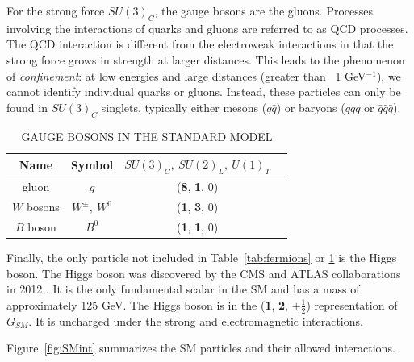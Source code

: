 For the strong force $SU(3)_C$, the gauge bosons are the gluons. Processes involving the interactions of quarks and gluons are referred to as QCD processes. The QCD interaction is different from the electroweak interactions in that the strong force grows in strength at larger distances. This leads to the phenomenon of \textit{confinement}: at low energies and large distances (greater than ~1 GeV$^{-1}$), we cannot identify individual quarks or gluons. Instead, these particles can only be found in $SU(3)_C$ singlets, typically either mesons ($q\bar{q}$) or baryons ($qqq$ or $\bar{q}\bar{q}\bar{q}$). 

\begin{table}[ht]
    \caption{GAUGE BOSONS IN THE STANDARD MODEL}
    \centering
    \begin{tabular}{|c|c|c|c|}
    \hline
    \hline
    Name  & Symbol & $SU(3)_C,~SU(2)_L,~U(1)_\Upsilon $\\
  	  \hline
           \hline    
gluon         & $g$   & (\textbf{8}, \textbf{1}, 0) \\
\hline
$W$ bosons & $W^\pm,~W^0$ & (\textbf{1}, \textbf{3}, 0) \\
\hline
$B$ boson & $B^0$ & (\textbf{1}, \textbf{1}, 0) \\
           \hline
           \hline
    \end{tabular}
    \label{tab:bosons}
\end{table}


Finally, the only particle not included in Table~\ref{tab:fermions} or \ref{tab:bosons} is the Higgs boson. The Higgs boson was discovered by the CMS and ATLAS collaborations in 2012 \cite{ATLASHiggs,CMSHiggs}. %
It is the only fundamental scalar in the SM and has a mass of approximately 125 GeV. The Higgs boson is in the (\textbf{1}, \textbf{2}, $+\frac{1}{2}$) representation of $G_{SM}$. It is uncharged under the strong and electromagnetic interactions. 

Figure~\ref{fig:SMint} summarizes the SM particles and their allowed interactions.

